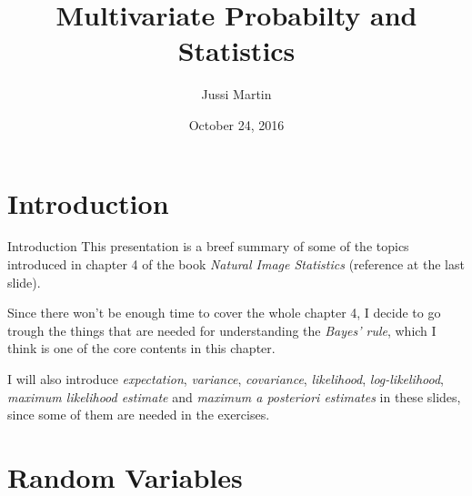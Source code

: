 \documentclass{beamer}
\title[Multivariate Probabilty and Statistics]{Multivariate Probabilty and Statistics}
\author{Jussi Martin}
\date{October 24, 2016}
\begin{document}
\begin{frame}
  \titlepage
\end{frame}


%
%
%
%
%

\section{Introduction}

\begin{frame}{Introduction}
  This presentation is a breef summary of some of the topics introduced in
  chapter 4 of the book \emph{Natural Image Statistics} (reference at
  the last slide).

  Since there won't be enough time to cover the whole chapter 4, I decide to go
  trough the things that are needed for understanding the \emph{Bayes' rule},
  which I think is one of the core contents in this chapter.

  I will also introduce \emph{expectation}, \emph{variance}, \emph{covariance},
  \emph{likelihood}, \emph{log-likelihood}, \emph{maximum likelihood estimate}
  and \emph{maximum a posteriori estimates} in these slides, since some of them
  are needed in the exercises.
\end{frame}

\section{Random Variables}
\end{document}
